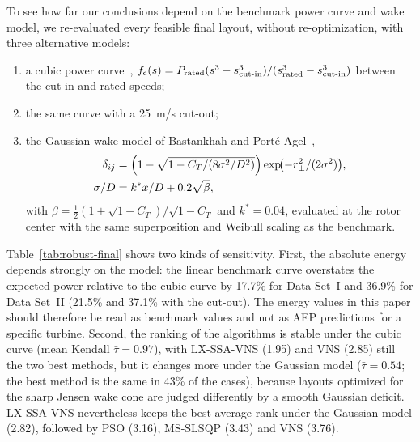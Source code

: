 \documentclass[journal,twoside]{IEEEtran}
\begin{document}
To see how far our conclusions depend on the benchmark power curve and wake model, we re-evaluated every feasible final layout, without re-optimization, with three alternative models:
\begin{enumerate}
\item a cubic power curve~\cite{Carrillo2013}, $f_{\rm c}(s)=P_{\text{rated}}(s^3-s_{\text{cut-in}}^3)/(s_{\text{rated}}^3-s_{\text{cut-in}}^3)$ between the cut-in and rated speeds;
\item the same curve with a 25~m/s cut-out;
\item the Gaussian wake model of Bastankhah and Port\'e-Agel~\cite{Bastankhah2014},
\begin{align*}
\delta_{ij}&=\Bigl(1-\sqrt{1-C_T/(8\sigma^2/D^2)}\Bigr)\exp\!\bigl(-r_\perp^2/(2\sigma^2)\bigr),\\
\sigma/D&=k^*x/D+0.2\sqrt{\beta},
\end{align*}
with $\beta=\tfrac12(1+\sqrt{1-C_T})/\sqrt{1-C_T}$ and $k^*=0.04$, evaluated at the rotor center with the same superposition and Weibull scaling as the benchmark.
\end{enumerate}

Table~\ref{tab:robust-final} shows two kinds of sensitivity. First, the absolute energy depends strongly on the model: the linear benchmark curve overstates the expected power relative to the cubic curve by 17.7\% for Data Set~I and 36.9\% for Data Set~II (21.5\% and 37.1\% with the cut-out). The energy values in this paper should therefore be read as benchmark values and not as AEP predictions for a specific turbine. Second, the ranking of the algorithms is stable under the cubic curve (mean Kendall $\bar\tau=0.97$), with LX-SSA-VNS (1.95) and VNS (2.85) still the two best methods, but it changes more under the Gaussian model ($\bar\tau=0.54$; the best method is the same in 43\% of the cases), because layouts optimized for the sharp Jensen wake cone are judged differently by a smooth Gaussian deficit. LX-SSA-VNS nevertheless keeps the best average rank under the Gaussian model (2.82), followed by PSO (3.16), MS-SLSQP (3.43) and VNS (3.76).
\end{document}
